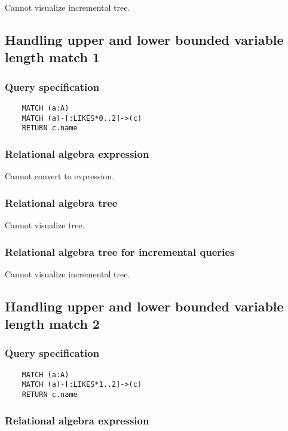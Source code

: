 	Cannot visualize incremental tree.
	\subsection{Handling upper and lower bounded variable length match 1}

	\subsubsection*{Query specification}

	\begin{lstlisting}
	MATCH (a:A)
	MATCH (a)-[:LIKES*0..2]->(c)
	RETURN c.name
	\end{lstlisting}


	\subsubsection*{Relational algebra expression}

	Cannot convert to expression.

	\subsubsection*{Relational algebra tree}

	Cannot visualize tree.

	\subsubsection*{Relational algebra tree for incremental queries}

	Cannot visualize incremental tree.
	\subsection{Handling upper and lower bounded variable length match 2}

	\subsubsection*{Query specification}

	\begin{lstlisting}
	MATCH (a:A)
	MATCH (a)-[:LIKES*1..2]->(c)
	RETURN c.name
	\end{lstlisting}


	\subsubsection*{Relational algebra expression}

